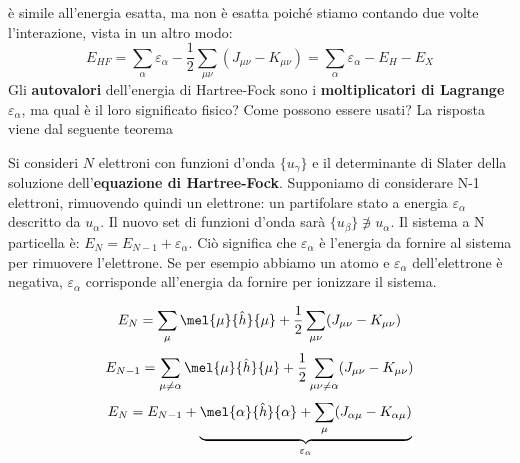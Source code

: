 è simile all'energia esatta, ma non è esatta poiché stiamo contando due volte l'interazione, vista in un altro modo:
\begin{equation*}
    E_{HF}=\sum_\alpha\varepsilon_\alpha-\frac 12\sum_{\mu\nu}(J_{\mu\nu}-K_{\mu\nu})=\sum_\alpha\varepsilon_\alpha-E_H-E_X
\end{equation*}
Gli \textbf{autovalori} dell'energia di Hartree-Fock sono i \textbf{moltiplicatori di Lagrange} $\varepsilon_\alpha$, ma qual è il loro significato fisico? Come possono essere usati? La risposta viene dal seguente teorema
\begin{theorem}
    Si consideri $N$ elettroni con funzioni d'onda $\{u_\gamma\}$ e il determinante di Slater della soluzione dell'\textbf{equazione di Hartree-Fock}. Supponiamo di considerare N-1 elettroni, rimuovendo quindi un elettrone: un partifolare stato a energia $\varepsilon_\alpha$ descritto da $u_\alpha$. Il nuovo set di funzioni d'onda sarà $\{u_\beta\}\not\owns u_\alpha$. Il sistema a N particella è: $E_N=E_{N-1}+\varepsilon_\alpha$. Ciò significa che $\varepsilon_\alpha$ è l'energia da fornire al sistema per rimuovere l'elettrone. Se per esempio abbiamo un atomo e $\varepsilon_\alpha$ dell'elettrone è negativa, $\varepsilon_\alpha$ corrisponde all'energia da fornire per ionizzare il sistema.
\end{theorem}
\begin{prf}
    \begin{equation*}
        E_N=\sum_\mu\mel{\mu}{\hat h}{\mu}+\frac 12\sum_{\mu\nu}(J_{\mu\nu}-K_{\mu\nu})
    \end{equation*}
    \begin{equation*}
        E_{N-1}=\sum_{\mu\neq\alpha}\mel{\mu}{\hat h}{\mu}+\frac 12\sum_{\mu\nu\neq \alpha}(J_{\mu\nu}-K_{\mu\nu})
    \end{equation*}
    \begin{equation*}
        E_N=E_{N-1}+\underbrace{\mel{\alpha}{\hat h}{\alpha}+\sum_\mu(J_{\alpha\mu}-K_{\alpha\mu})}_{\varepsilon_\alpha}
    \end{equation*}
\end{prf}

